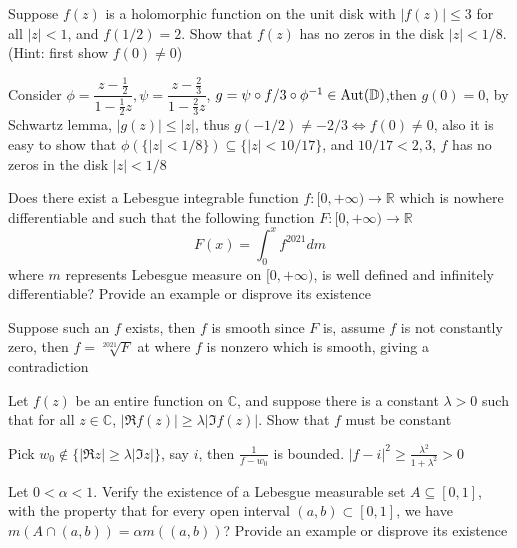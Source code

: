 \documentclass[main]{subfiles}
\begin{document}
\begin{exercise}
Suppose $f(z)$ is a holomorphic function on the unit disk with $|f(z)| \leq 3$ for all $|z| < 1$, and $f(1/2) = 2$. Show that $f(z)$ has no zeros in the disk $|z| < 1/8$. (Hint: first show $f(0) \neq 0$)
\end{exercise}

\begin{solution}
Consider $\phi=\dfrac{z-\frac{1}{2}}{1-\frac{1}{2}z},\psi=\dfrac{z-\frac{2}{3}}{1-\frac{2}{3}z}$, $g=\psi\circ f/3\circ\phi^{-1}\in\operatorname{Aut}(\mathbb D)$,then $g(0)=0$, by Schwartz lemma, $|g(z)|\leq |z|$, thus $g(-1/2)\neq-2/3\Leftrightarrow f(0)\neq0$, also it is easy to show that $\phi(\{|z|<1/8\})\subseteq\{|z|<10/17\}$, and $10/17<2,3$, $f$ has no zeros in the disk $|z|<1/8$
\end{solution}

\begin{exercise}
Does there exist a Lebesgue integrable function $f : [0, +\infty) \to\mathbb R$ which is nowhere differentiable and such that the following function $F : [0, +\infty) \to\mathbb R$
\[F(x)=\int_0^xf^{2021}dm\]
where $m$ represents Lebesgue measure on $[0, +\infty)$, is well defined and infinitely differentiable? Provide an example or disprove its existence
\end{exercise}

\begin{solution}
Suppose such an $f$ exists, then $f$ is smooth since $F$ is, assume $f$ is not constantly zero, then $f=\sqrt[2021]{F}$ at where $f$ is nonzero which is smooth, giving a contradiction
\end{solution}

\begin{exercise}
Let $f(z)$ be an entire function on $\mathbb C$, and suppose there is a constant $\lambda > 0$ such that for all $z \in \mathbb C$, $|\Re f(z)| \geq \lambda|\Im f(z)|$. Show that $f$ must be constant
\end{exercise}

\begin{solution}
Pick $w_0\notin\{|\Re z|\geq\lambda|\Im z|\}$, say $i$, then $\frac{1}{f-w_0}$ is bounded. $|f-i|^2\geq\frac{\lambda^2}{1+\lambda^2}>0$
\end{solution}

\begin{exercise}
Let $0 < \alpha < 1$. Verify the existence of a Lebesgue measurable set $A \subseteq [0, 1]$, with the property that for every open interval $(a, b) \subset [0, 1]$, we have $m(A \cap (a, b)) = \alpha m((a, b))$? Provide an example or disprove its existence
\end{exercise}
\end{document}
